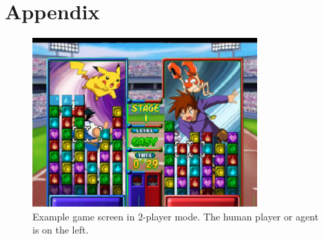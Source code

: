 \documentclass[10pt, final]{article}
\begin{document}
\section{Appendix}
\begin{figure}[h!]\begin{center}
\includegraphics[width=3.4in]{game.jpg}
\caption{Example game screen in $2$-player mode. The human player or agent is on the left.}
\label{fig:screenshot}
\end{center}\end{figure}
\end{document}
